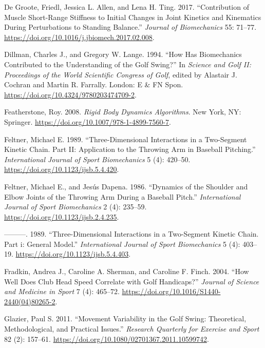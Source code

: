 \documentclass[
  letterpaper,
]{report}
\newlength{\cslhangindent}
\newenvironment{CSLReferences}[2] %
 {\begin{list}{}{%
  \setlength{\itemindent}{0pt}
  \setlength{\leftmargin}{0pt}
  \setlength{\parsep}{0pt}
  \ifodd #1
   \setlength{\leftmargin}{\cslhangindent}
   \setlength{\itemindent}{-1\cslhangindent}
  \fi
  \setlength{\itemsep}{#2\baselineskip}}}
 {\end{list}}
\begin{document}
\begin{CSLReferences}{1}{0}
De Groote, Friedl, Jessica L. Allen, and Lena H. Ting. 2017.
{``Contribution of Muscle Short-Range Stiffness to Initial Changes in
Joint Kinetics and Kinematics During Perturbations to Standing
Balance.''} \emph{Journal of Biomechanics} 55: 71--77.
\url{https://doi.org/10.1016/j.jbiomech.2017.02.008}.

Dillman, Charles J., and Gregory W. Lange. 1994. {``How Has Biomechanics
Contributed to the Understanding of the Golf Swing?''} In \emph{Science
and Golf II: Proceedings of the World Scientific Congress of Golf},
edited by Alastair J. Cochran and Martin R. Farrally. London: E \& FN
Spon. \url{https://doi.org/10.4324/9780203474709-2}.

Featherstone, Roy. 2008. \emph{Rigid Body Dynamics Algorithms}. New
York, NY: Springer. \url{https://doi.org/10.1007/978-1-4899-7560-7}.

Feltner, Michael E. 1989. {``Three-Dimensional Interactions in a
Two-Segment Kinetic Chain. Part II: Application to the Throwing Arm in
Baseball Pitching.''} \emph{International Journal of Sport Biomechanics}
5 (4): 420--50. \url{https://doi.org/10.1123/ijsb.5.4.420}.

Feltner, Michael E., and Jesús Dapena. 1986. {``Dynamics of the Shoulder
and Elbow Joints of the Throwing Arm During a Baseball Pitch.''}
\emph{International Journal of Sport Biomechanics} 2 (4): 235--59.
\url{https://doi.org/10.1123/ijsb.2.4.235}.

---------. 1989. {``Three-Dimensional Interactions in a Two-Segment
Kinetic Chain. Part i: General Model.''} \emph{International Journal of
Sport Biomechanics} 5 (4): 403--19.
\url{https://doi.org/10.1123/ijsb.5.4.403}.

Fradkin, Andrea J., Caroline A. Sherman, and Caroline F. Finch. 2004.
{``How Well Does Club Head Speed Correlate with Golf Handicaps?''}
\emph{Journal of Science and Medicine in Sport} 7 (4): 465--72.
\url{https://doi.org/10.1016/S1440-2440(04)80265-2}.

Glazier, Paul S. 2011. {``Movement Variability in the Golf Swing:
Theoretical, Methodological, and Practical Issues.''} \emph{Research
Quarterly for Exercise and Sport} 82 (2): 157--61.
\url{https://doi.org/10.1080/02701367.2011.10599742}.


\end{CSLReferences}
\end{document}
